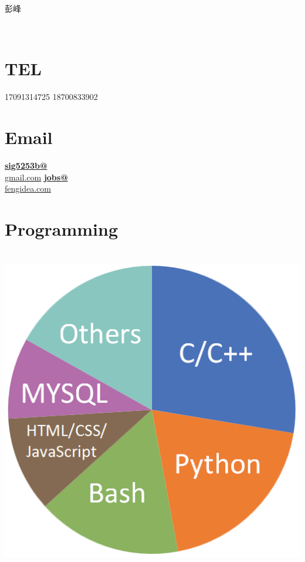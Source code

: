 \documentclass[]{friggeri-cv}
\begin{document}
      { 彭峰 } 



\begin{aside}
    ~
    ~
  \section{TEL}
    17091314725
    18700833902
    ~
  \section{Email}
    \href{mailto:sig5253b@gmail.com}{\textbf{sig5253b@}\\gmail.com}
    \href{mailto:jobs@fengidea.com}{\textbf{jobs@}\\fengidea.com}
    ~
    ~
  \section{Programming}
  ~
    \includegraphics[scale=0.25]{img/programming3.png}
    ~

\end{aside}
\end{document}
